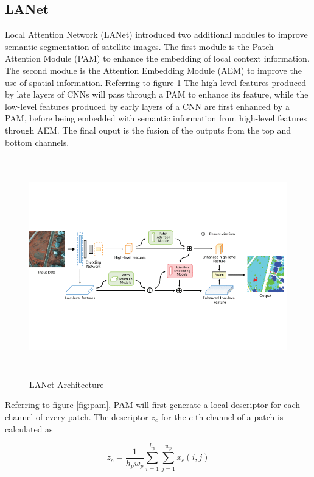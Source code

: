 \FloatBarrier

\subsection{LANet}
Local Attention Network (LANet) \cite{lanet}introduced two additional modules to improve semantic segmentation of satellite images. The first module is the Patch Attention Module (PAM) to enhance the embedding of local context information. The second module is the Attention Embedding Module (AEM) to improve the use of spatial information. Referring to figure \ref{fig:lanet} The high-level features produced by late layers of CNNs will pass through a PAM to enhance its feature, while the low-level features produced by early layers of a CNN are first enhanced by a PAM, before being embedded with semantic information from high-level features through AEM. The final ouput is the fusion of the outputs from the top and bottom channels. 

\FloatBarrier
\begin{figure}[ht]
\includegraphics[width=12.5cm, height=9.5cm]{images/lanet.png}
\centering
\caption{LANet Architecture}
\label{fig:lanet}
\end{figure}

\FloatBarrier

Referring to figure \ref{fig:pam}, PAM will first generate a local descriptor for each channel of every patch. The descriptor $z_c$ for the $c$ th channel of a patch is calculated as

\begin{equation}
    z_c = \frac{1}{h_p w_p} \sum_{i=1}^{h_p} \sum_{j=1}^{w_p} x_c(i,j)
\end{equation}

